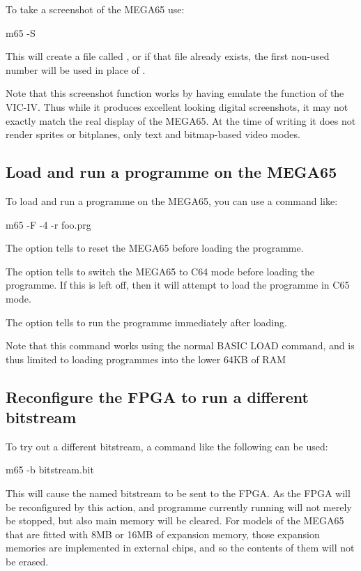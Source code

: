 To take a screenshot of the MEGA65 use:

\begin{screenoutput}
m65 -S
\end{screenoutput}

This will create a file called ,
or if that file already exists, the first non-used number will be used
in place of .

Note that this screenshot function works by having  emulate the
function of the VIC-IV. Thus while it produces excellent looking
digital screenshots, it may not exactly match the real display of the
MEGA65.  At the time of writing it does not render sprites or
bitplanes, only text and bitmap-based video modes.

\subsection{Load and run a programme on the MEGA65}

To load and run a programme on the MEGA65, you can use a command like:

\begin{screenoutput}
m65 -F -4 -r foo.prg
\end{screenoutput}

The  option tells  to reset the MEGA65
before loading the programme.

The  option tells  to switch the MEGA65
to C64 mode before loading the programme. If this is left off, then it
will attempt to load the programme in C65 mode.

The  option tells  to run the programme
immediately after loading.

Note that this command works using the normal BASIC LOAD command, and
is thus limited to loading programmes into the lower 64KB of RAM

\subsection{Reconfigure the FPGA to run a different bitstream}

To try out a different bitstream, a command like the following can be
used:

\begin{screenoutput}
m65 -b bitstream.bit
\end{screenoutput}

This will cause the named bitstream to be sent to the FPGA.  As the
FPGA will be reconfigured by this action, and programme currently
running will not merely be stopped, but also main memory will be
cleared. For models of the MEGA65 that are fitted with 8MB or 16MB of
expansion memory, those expansion memories are implemented in external
chips, and so the contents of them will not be erased.

